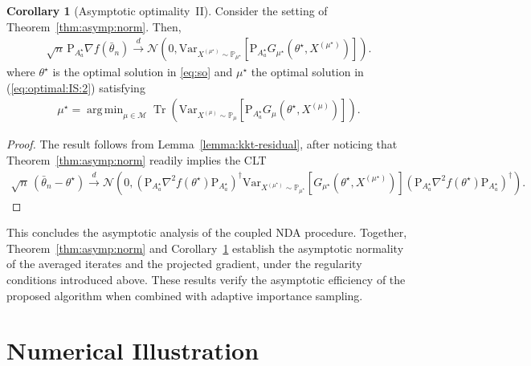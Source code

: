 \documentclass[11pt,a4paper]{article}
\theoremstyle{definition}
\newtheorem{corollary}[theorem]{Corollary}
\DeclareMathOperator*{\argmin}{arg\,min}
\DeclareMathOperator*{\trace}{Tr}
\begin{document}
\begin{corollary}[Asymptotic optimality~II]
\label{cor:asymp:norm}
Consider the setting of Theorem~\ref{thm:asymp:norm}. Then,
\begin{align*}
    \sqrt{n}\, \text{P}_{A^\star_{a}} \nabla f(\bar{\theta}_n)  \overset{d}{\to} \mathcal N \left(0, \text{Var}_{X^{(\mu^\star)} \sim \mathbb P_{\mu^\star}}\left[\text{P}_{A^\star_{a}} G_{\mu^\star}(\theta^\star, X^{(\mu^\star)})\right] \right).
\end{align*}
where $\theta^\star$ is the optimal solution in \eqref{eq:so} and $\mu^\star$ the optimal solution in (\ref{eq:optimal:IS:2}) satisfying
\begin{align*}
    \mu^\star = \argmin_{\mu \in \mathcal M} \trace\left(\text{Var}_{X^{(\mu)} \sim \mathbb P_\mu}\left[\text{P}_{A^\star_{a}} G_\mu(\theta^\star, X^{(\mu)})\right]\right).
\end{align*}
\end{corollary}
\begin{proof}
The result follows from Lemma~\ref{lemma:kkt-residual}, after noticing that Theorem~\ref{thm:asymp:norm} readily implies the CLT
\begin{align*}
    \sqrt{n}\,(\bar{\theta}_n - \theta^\star) \overset{d}{\to} \mathcal N (0, (\text{P}_{A^\star_{a}}\nabla^2 f(\theta^\star) \text{P}_{A^\star_{a}})^\dagger \text{Var}_{X^{(\mu^\star)} \sim \mathbb P_{\mu^\star}}\left[G_{\mu^\star}(\theta^\star, X^{(\mu^\star)})\right] (\text{P}_{A^\star_{a}}\nabla^2 f(\theta^\star) \text{P}_{A^\star_{a}})^\dagger).
\end{align*}
\end{proof}

This concludes the asymptotic analysis of the coupled NDA procedure. Together, Theorem~\ref{thm:asymp:norm} and Corollary~\ref{cor:asymp:norm} establish the asymptotic normality of the averaged iterates and the projected gradient, under the regularity conditions introduced above. These results verify the asymptotic efficiency of the proposed algorithm when combined with adaptive importance sampling.






\section{Numerical Illustration}
\label{sec:numerics}
\end{document}
